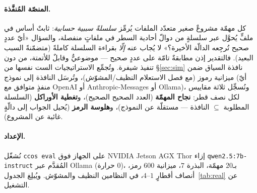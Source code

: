 \documentclass[11pt]{article}
\newcommand{\code}[1]{\textenglish{\texttt{#1}}}
\begin{document}
\paragraph{المنصّة المُنفَّذة.} كل مهمّة مشروعٌ صغير متعدّد الملفات يُرمِّز \emph{سلسلةً سببية
حسابية}: ثابتٌ أساس في ملفٍّ يُحوَّل عبر سلسلةٍ من دوالّ أحادية السطر في ملفاتٍ منفصلة،
والسؤال «أيّ عددٍ صحيح تُرجِعه الدالّة الأخيرة؟» لا يُجاب عنه \emph{إلّا} بقراءة السلسلة
كاملةً (متضمّنةً السبب البعيد). فالتقدير إذن مطابقةٌ تامّة على عددٍ صحيح --- موضوعيٌّ وقابلٌ
للأتمتة، من دون تنفيذ شيفرة. وتُجمِّع الاستراتيجيات الست نفسها من \S\ref{sec:sim} نافذة
السياق ضمن ميزانية رموز (مع فصل الاستعلام النظيف/المشوّش)، وتُرسَل النافذة إلى نموذج (أيّ
منفذٍ متوافق مع OpenAI أو Anthropic-Messages أو Ollama)، ونُسجِّل ثلاثة مقاييس لكل نصف
قطر: \textbf{نجاح المهمّة} (العدد الصحيح الصحيح)، و\textbf{تغطية الأوراكل} (السلسلة المطلوبة
$\subseteq$ النافذة --- مستقلّة عن النموذج)، و\textbf{هلوسة الرمز} (يُحيل الجواب إلى دالّةٍ
غائبة عن المشروع).

\paragraph{الإعداد.} نُشغّل \code{ccos eval} على الجهاز فوق NVIDIA Jetson AGX Thor إزاء
\code{qwen2.5:7b-instruct} المُقدَّم عبر Ollama (حرارة $0$)، بـ$20$ مهمّة، البذرة $7$،
ميزانية $600$ رمز، أنصاف أقطارٍ $1$--$4$، في النظامين النظيف والمشوّش. ويُبلِغ
الجدول~\ref{tab:real} عن التشغيل.
\end{document}
